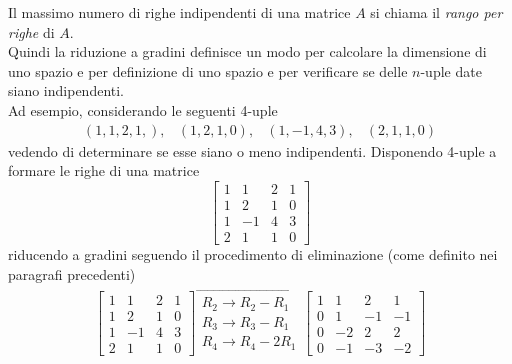\begin{defi}
  \label{defi:gauss-jorda2}
  Il massimo numero di righe indipendenti di una matrice $A$ si
  chiama il \textit{rango per righe} di $A$.\\
  Quindi la riduzione a gradini definisce un modo per calcolare la
  dimensione di uno spazio e per definizione di uno spazio e per
  verificare se delle $n$-uple date siano indipendenti.\\
  Ad esempio, considerando le seguenti 4-uple
  \begin{equation}
    \label{eq:gauss-jorda2-1}
    \begin{matrix}
      (1,1,2,1,), & (1,2,1,0), & (1,-1,4,3), & (2,1,1,0)
    \end{matrix} 
  \end{equation}
  vedendo di determinare se esse siano o meno indipendenti. Disponendo
  4-uple a formare le righe di una matrice
  \begin{equation*}
    \begin{bmatrix}
      1 & 1 & 2 & 1\\
      1 & 2 & 1 & 0\\
      1 & -1 & 4 & 3\\
      2 & 1 & 1 & 0
    \end{bmatrix}
  \end{equation*}
  riducendo a gradini seguendo il procedimento di eliminazione (come
  definito nei paragrafi precedenti)
  \begin{equation}
    \label{eq:gauss-jorda2-2}
    \begin{matrix}
      \begin{bmatrix}
        1 & 1 & 2 & 1\\
        1 & 2 & 1 & 0\\
        1 & -1 & 4 & 3\\
        2 & 1 & 1 & 0
      \end{bmatrix}
      \overrightarrow{
      \begin{matrix}
        R_2\to R_2-R_1\\
        R_3\to R_3-R_1\\
        R_4\to R_4-2R_1
      \end{matrix}
      }
      \begin{bmatrix}
        1 & 1 & 2 & 1\\
        0 & 1 & -1 & -1\\
        0 & -2 & 2 & 2\\
        0 & -1 & -3 & -2
      \end{bmatrix}

\end{matrix}
\end{equation}
\end{defi}
